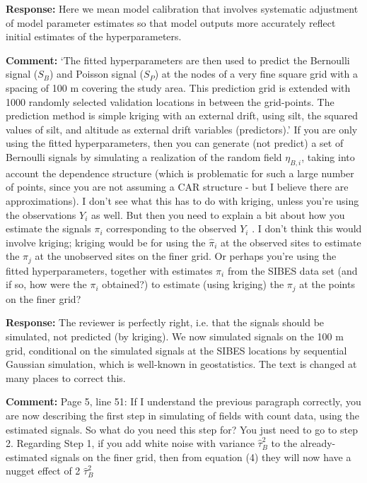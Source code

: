\documentclass{letter}
\begin{document}
\begin{letter}
\textbf{Response:}
Here we mean model calibration that involves systematic adjustment of model parameter estimates so that model outputs more accurately reflect initial estimates of the hyperparameters. 

\textbf{Comment:} 
`The fitted hyperparameters are then used to predict the Bernoulli signal ($S_B$) and Poisson signal ($S_P$) at the nodes of a very fine square grid with a spacing of 100 m covering the study area.  This prediction grid is extended with 1000 randomly selected validation locations in between the grid-points.  The prediction method is simple kriging with an external drift, using silt, the squared values of silt, and altitude as external drift variables (predictors).' 
If you are only using the fitted hyperparameters, then you can generate (not predict) a set of Bernoulli signals by simulating a realization of the random field $\eta_{B, i}$, taking into account the dependence structure (which is problematic for such a large number of points, since you are not assuming a CAR structure - but I believe there are approximations).  
I don't see what this has to do with kriging, unless you’re using the observations $Y_i$ as well.  
But then you need to explain a bit about how you estimate the signals $\pi_i$ corresponding to the observed $Y_i$ .  
I don't think this would involve kriging; kriging would be for using the $\hat{\pi}_i$ at the observed sites to estimate the $\pi_j$ at the unobserved sites on the finer grid. Or perhaps you’re using the fitted hyperparameters, together with estimates $\pi_{i}$ from the SIBES data set (and if so, how were the $\pi_{i}$ obtained?) to estimate (using kriging) the $\pi_{j}$ at the points on the finer grid?  

\textbf{Response:}
The reviewer is perfectly right, i.e. that the signals should be simulated, not predicted (by kriging). We now simulated signals on the 100 m grid, conditional on the simulated signals at the SIBES locations  by sequential Gaussian simulation, which is well-known in geostatistics. The text is changed at many places to correct this.  

\textbf{Comment:} 
Page 5, line 51: If I understand the previous paragraph correctly, you are now describing the first step in simulating of fields with count data, using the estimated signals.  So what do you need this step for?  You just need to go to step 2.  Regarding Step 1, if you add white noise with variance $\hat{\tau}_B^2$ to the already-estimated signals on the finer grid, then from equation (4) they will now have a nugget effect of 2 $\hat{\tau}_B^2$ 


\end{letter}
\end{document}
